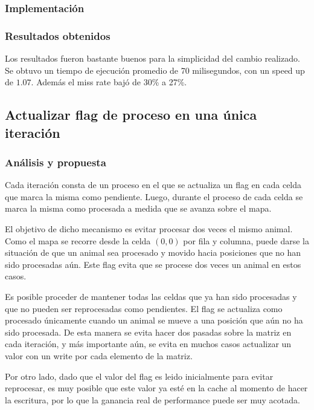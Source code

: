 \documentclass[a4paper,11pt]{article}
\begin{document}
\subsubsection{Implementación}



\subsubsection{Resultados obtenidos}

Los resultados fueron bastante buenos para la simplicidad del cambio realizado.
Se obtuvo un tiempo de ejecución promedio de 70 milisegundos, con un speed up
de \(1.07\). Además el miss rate bajó de 30\% a 27\%.

\subsection{Actualizar flag de proceso en una única iteración}

\subsubsection{Análisis y propuesta}

Cada iteración consta de un proceso en el que se actualiza un flag en cada
celda que marca la misma como pendiente. Luego, durante el proceso de cada
celda se marca la misma como procesada a medida que se avanza sobre el mapa.

El objetivo de dicho mecanismo es evitar procesar dos veces el mismo animal.
Como el mapa se recorre desde la celda \((0, 0)\) por fila y columna, puede
darse la situación de que un animal sea procesado y movido hacia posiciones que
no han sido procesadas aún. Este flag evita que se procese dos veces un animal
en estos casos.

Es posible proceder de mantener todas las celdas que ya han sido procesadas y
que no pueden ser reprocesadas como pendientes. El flag se actualiza como
procesado únicamente cuando un animal se mueve a una posición que aún no ha
sido procesada. De esta manera se evita hacer dos pasadas sobre la matriz en
cada iteración, y más importante aún, se evita en muchos casos actualizar un
valor con un write por cada elemento de la matriz.

Por otro lado, dado que el valor del flag es leido inicialmente para evitar
reprocesar, es muy posible que este valor ya esté en la cache al momento de
hacer la escritura, por lo que la ganancia real de performance puede ser muy
acotada.
\end{document}
